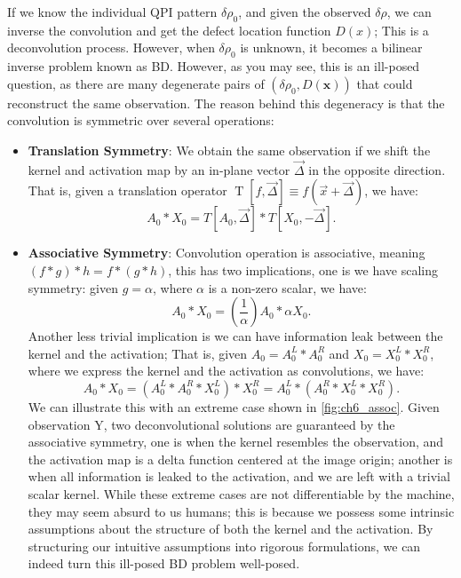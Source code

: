 \noindent If we know the individual QPI pattern $\delta\rho_0$, and given the observed $\delta\rho$, we can inverse the convolution and get the defect location function $D(x)$; This is a deconvolution process. However, when $\delta\rho_0$ is unknown, it becomes a bilinear inverse problem known as \ac{BD}. However, as you may see, this is an ill-posed question, as there are many degenerate pairs of $(\delta\rho_0, D(\mathbf{x}))$ that could reconstruct the same observation. The reason behind this degeneracy is that the convolution is symmetric over several operations: 
\begin{itemize}
	\item \textbf{Translation Symmetry}: We obtain the same observation if we shift the kernel and activation map by an in-plane vector $\vec{\Delta}$ in the opposite direction. That is, given a translation operator $\operatorname{T}[f,\vec{\Delta}] \equiv f(\vec{x}+\vec{\Delta})$, we have:  
	\begin{equation}
		\label{translational_symm}
		A_0 * X_0 = T[A_0,\vec{\Delta}] * T[X_0, -\vec{\Delta}].
	\end{equation}
	\item \textbf{Associative Symmetry}: Convolution operation is associative, meaning $(f * g) * h = f * (g *h)$, this has two implications, one is we have scaling symmetry: given $g = \alpha$, where $\alpha$ is a non-zero scalar, we have: 
	\begin{equation}
		A_0 * X_0 = (\frac{1}{\alpha})A_0*\alpha X_0.
	\end{equation}
	Another less trivial implication is we can have information leak between the kernel and the activation; That is, given $A_0 = A_0^L * A_0^R$ and $X_0= X_0^L * X_0^R$, where we express the kernel and the activation as convolutions, we have: 
	\begin{equation}
		A_0 * X_0 = (A_0^L * A_0^R * X_0^L) * X_0^R = A_0^L * (A_0^R * X_0^L * X_0^R).
	\end{equation}
	We can illustrate this with an extreme case shown in \ref{fig:ch6_assoc}. Given observation Y, two deconvolutional solutions are guaranteed by the associative symmetry, one is when the kernel resembles the observation, and the activation map is a delta function centered at the image origin; another is when all information is leaked to the activation, and we are left with a trivial scalar kernel. While these extreme cases are not differentiable by the machine, they may seem absurd to us humans; this is because we possess some intrinsic assumptions about the structure of both the kernel and the activation. By structuring our intuitive assumptions into rigorous formulations, we can indeed turn this ill-posed \ac{BD} problem well-posed. 
	
\end{itemize}



